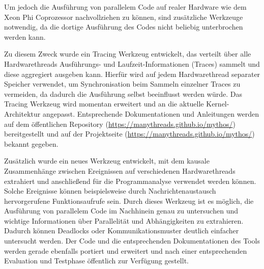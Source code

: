 Um jedoch die Ausführung von parallelem Code auf realer Hardware wie dem Xeon
Phi Coprozessor nachvollziehen zu können, sind zusätzliche Werkzeuge notwendig,
da die dortige Ausführung des Codes nicht beliebig unterbrochen werden kann.

Zu diesem Zweck wurde ein Tracing Werkzeug entwickelt, das verteilt über alle
Hardwarethreads Ausführungs- und Laufzeit-Informationen (Traces) sammelt und
diese aggregiert ausgeben kann.
Hierfür wird auf jedem Hardwarethread separater Speicher verwendet, um
Synchronisation beim Sammeln einzelner Traces zu vermeiden, da dadurch die
Ausführung selbst beeinflusst werden würde.  Das Tracing Werkzeug wird momentan erweitert
und an die aktuelle Kernel-Architektur angepasst. Entsprechende Dokumentationen
und Anleitungen werden auf dem öffentlichen Repository
(\url{https://manythreads.github.io/mythos/}) bereitgestellt und auf der
Projektseite (\url{https://manythreads.github.io/mythos/}) bekannt gegeben.

Zusätzlich wurde ein neues Werkzeug entwickelt, mit dem kausale Zusammenhänge
zwischen Ereignissen auf verschiedenen Hardwarethreads extrahiert und
anschließend für die Programmanalyse verwendet werden können. Solche Ereignisse
können beispielsweise durch Nachrichtenaustausch hervorgerufene Funktionsaufrufe
sein. Durch dieses Werkzeug ist es möglich, die Ausführung von parallelem Code
im Nachhinein genau zu untersuchen und wichtige Informationen über Parallelität
und Abhängigkeiten zu extrahieren. Dadurch können Deadlocks oder
Kommunikationsmuster deutlich einfacher untersucht werden. Der Code und die
entsprechenden Dokumentationen des Tools werden gerade ebenfalls portiert und
erweitert und nach einer entsprechenden Evaluation und Testphase öffentlich zur
Verfügung gestellt.

% 
% 


